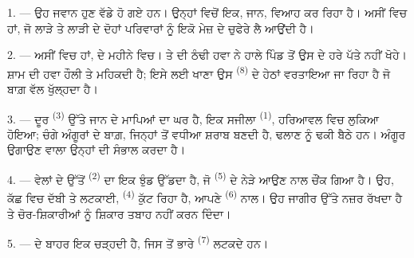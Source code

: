 %

\VUsaut{4.0mm}
\VUsaut{1.6mm}
\VUsaut{3.2mm}

\VUsaut{1.6mm}
\VUsaut{2.6mm}

\VUsaut{3.0mm}

1. --- ਉਹ ਜਵਾਨ ਹੁਣ ਵੱਡੇ ਹੋ ਗਏ ਹਨ। ਉਨ੍ਹਾਂ ਵਿਚੋਂ ਇਕ, ਜਾਨ, ਵਿਆਹ ਕਰ ਰਿਹਾ ਹੈ। ਅਸੀਂ
 ਵਿਚ ਹਾਂ, ਜੋ ਲਾੜੇ ਤੇ ਲਾੜੀ ਦੇ ਦੋਹਾਂ ਪਰਿਵਾਰਾਂ ਨੂੰ ਇਕੋ ਮੇਜ਼
ਦੇ ਚੁਫੇਰੇ ਲੈ ਆਉਂਦੀ ਹੈ।

2. --- ਅਸੀਂ  ਵਿਚ ਹਾਂ,  ਦੇ ਮਹੀਨੇ ਵਿਚ।
 ਤੇ  ਦੀ ਠੰਢੀ ਹਵਾ ਨੇ ਹਾਲੇ ਪਿੰਡ ਤੋਂ ਉਸ ਦੇ ਹਰੇ ਪੱਤੇ
ਨਹੀਂ ਖੋਹੇ। ਸ਼ਾਮ ਦੀ ਹਵਾ ਹੌਲੀ ਤੇ ਮਹਿਕਦੀ ਹੈ; ਇਸੇ ਲਈ ਖਾਣਾ ਉਸ 
\textsuperscript{(8)} ਦੇ ਹੇਠਾਂ ਵਰਤਾਇਆ ਜਾ ਰਿਹਾ ਹੈ ਜੋ ਬਾਗ਼ ਵੱਲ ਖੁੱਲ੍ਹਦਾ ਹੈ।

3. --- ਦੂਰ  \textsuperscript{(3)} ਉੱਤੇ ਜਾਨ ਦੇ ਮਾਪਿਆਂ ਦਾ ਘਰ ਹੈ, ਇਕ
ਸਜੀਲਾ  \textsuperscript{(1)}, ਹਰਿਆਵਲ ਵਿਚ ਲੁਕਿਆ ਹੋਇਆ; ਚੰਗੇ
ਅੰਗੂਰਾਂ ਦੇ ਬਾਗ਼, ਜਿਨ੍ਹਾਂ ਤੋਂ ਵਧੀਆ ਸ਼ਰਾਬ ਬਣਦੀ ਹੈ, ਢਲਾਣ ਨੂੰ ਢਕੀ ਬੈਠੇ ਹਨ। ਅੰਗੂਰ
ਉਗਾਉਣ ਵਾਲਾ ਉਨ੍ਹਾਂ ਦੀ ਸੰਭਾਲ ਕਰਦਾ ਹੈ।

4. --- ਵੇਲਾਂ ਦੇ ਉੱਤੋਂ  \textsuperscript{(2)} ਦਾ ਇਕ ਝੁੰਡ ਉੱਡਦਾ ਹੈ,
ਜੋ  \textsuperscript{(5)} ਦੇ ਨੇੜੇ ਆਉਣ ਨਾਲ ਚੌਂਕ ਗਿਆ ਹੈ। ਉਹ,
ਕੱਛ ਵਿਚ  ਦੱਬੀ ਤੇ  ਲਟਕਾਈ,
 \textsuperscript{(4)} ਕੁੱਟ ਰਿਹਾ ਹੈ, ਆਪਣੇ 
\textsuperscript{(6)} ਨਾਲ। ਉਹ ਜਾਗੀਰ ਉੱਤੇ ਨਜ਼ਰ ਰੱਖਦਾ ਹੈ ਤੇ ਚੋਰ-ਸ਼ਿਕਾਰੀਆਂ ਨੂੰ ਸ਼ਿਕਾਰ
ਤਬਾਹ ਨਹੀਂ ਕਰਨ ਦਿੰਦਾ।

5. ---  ਦੇ ਬਾਹਰ ਇਕ  ਚੜ੍ਹਦੀ ਹੈ, ਜਿਸ ਤੋਂ
ਭਾਰੇ  \textsuperscript{(7)} ਲਟਕਦੇ ਹਨ।

